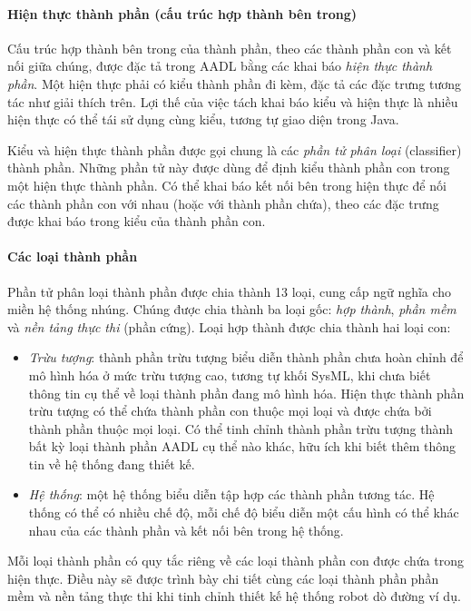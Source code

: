 \paragraph*{Hiện thực thành phần (cấu trúc hợp thành bên trong)}
Cấu trúc hợp thành bên trong của thành phần, theo các thành phần con và kết nối giữa chúng, được đặc tả trong AADL bằng các khai báo \emph{hiện thực thành phần}. Một hiện thực phải có kiểu thành phần đi kèm, đặc tả các đặc trưng tương tác như giải thích trên. Lợi thế của việc tách khai báo kiểu và hiện thực là nhiều hiện thực có thể tái sử dụng cùng kiểu, tương tự giao diện trong Java.

Kiểu và hiện thực thành phần được gọi chung là các \emph{phần tử phân loại} (classifier) thành phần. Những phần tử này được dùng để định kiểu thành phần con trong một hiện thực thành phần. Có thể khai báo kết nối bên trong hiện thực để nối các thành phần con với nhau (hoặc với thành phần chứa), theo các đặc trưng được khai báo trong kiểu của thành phần con.

\paragraph*{Các loại thành phần}
Phần tử phân loại thành phần được chia thành 13 loại, cung cấp ngữ nghĩa cho miền hệ thống nhúng. Chúng được chia thành ba loại gốc: \emph{hợp thành}, \emph{phần mềm} và \emph{nền tảng thực thi} (phần cứng). Loại hợp thành được chia thành hai loại con:
\begin{itemize}
\item \emph{Trừu tượng}: thành phần trừu tượng biểu diễn thành phần chưa hoàn chỉnh để mô hình hóa ở mức trừu tượng cao, tương tự khối SysML, khi chưa biết thông tin cụ thể về loại thành phần đang mô hình hóa. Hiện thực thành phần trừu tượng có thể chứa thành phần con thuộc mọi loại và được chứa bởi thành phần thuộc mọi loại. Có thể tinh chỉnh thành phần trừu tượng thành bất kỳ loại thành phần AADL cụ thể nào khác, hữu ích khi biết thêm thông tin về hệ thống đang thiết kế.
\item \emph{Hệ thống}: một hệ thống biểu diễn tập hợp các thành phần tương tác. Hệ thống có thể có nhiều chế độ, mỗi chế độ biểu diễn một cấu hình có thể khác nhau của các thành phần và kết nối bên trong hệ thống.
\end{itemize}
Mỗi loại thành phần có quy tắc riêng về các loại thành phần con được chứa trong hiện thực. Điều này sẽ được trình bày chi tiết cùng các loại thành phần phần mềm và nền tảng thực thi khi tinh chỉnh thiết kế hệ thống robot dò đường ví dụ.

